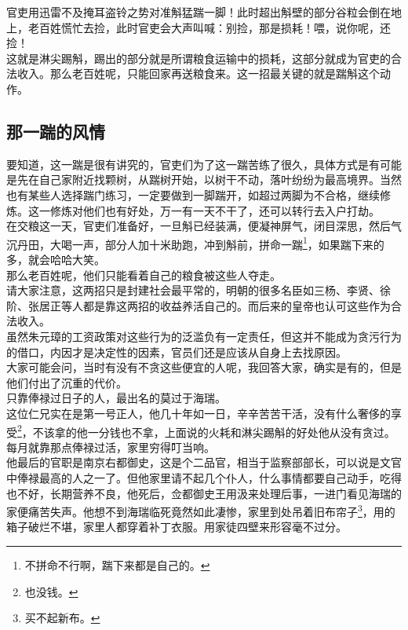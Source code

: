 \begin{multicols}{\theparacolNo}
官吏用迅雷不及掩耳盗铃之势对准斛猛踹一脚！此时超出斛壁的部分谷粒会倒在地上，老百姓慌忙去捡，此时官吏会大声叫喊：别捡，那是损耗！喂，说你呢，还捡！\\

这就是淋尖踢斛，踢出的部分就是所谓粮食运输中的损耗，这部分就成为官吏的合法收入。那么老百姓呢，只能回家再送粮食来。这一招最关键的就是踹斛这个动作。\\

\subsection{那一踹的风情}
要知道，这一踹是很有讲究的，官吏们为了这一踹苦练了很久，具体方式是有可能是先在自己家附近找颗树，从踹树开始，以树干不动，落叶纷纷为最高境界。当然也有某些人选择踹门练习，一定要做到一脚踹开，如超过两脚为不合格，继续修炼。这一修炼对他们也有好处，万一有一天不干了，还可以转行去入户打劫。\\

在交粮这一天，官吏们准备好，一旦斛已经装满，便凝神屏气，闭目深思，然后气沉丹田，大喝一声，部分人加十米助跑，冲到斛前，拼命一踹\footnote{不拼命不行啊，踹下来都是自己的。}，如果踹下来的多，就会哈哈大笑。\\

那么老百姓呢，他们只能看着自己的粮食被这些人夺走。\\

请大家注意，这两招只是封建社会最平常的，明朝的很多名臣如三杨、李贤、徐阶、张居正等人都是靠这两招的收益养活自己的。而后来的皇帝也认可这些作为合法收入。\\

虽然朱元璋的工资政策对这些行为的泛滥负有一定责任，但这并不能成为贪污行为的借口，内因才是决定性的因素，官员们还是应该从自身上去找原因。\\

大家可能会问，当时有没有不贪这些便宜的人呢，我回答大家，确实是有的，但是他们付出了沉重的代价。\\

只靠俸禄过日子的人，最出名的莫过于海瑞。\\

这位仁兄实在是第一号正人，他几十年如一日，辛辛苦苦干活，没有什么奢侈的享受\footnote{也没钱。}，不该拿的他一分钱也不拿，上面说的火耗和淋尖踢斛的好处他从没有贪过。每月就靠那点俸禄过活，家里穷得叮当响。\\

他最后的官职是南京右都御史，这是个二品官，相当于监察部部长，可以说是文官中俸禄最高的人之一了。但他家里请不起几个仆人，什么事情都要自己动手，吃得也不好，长期营养不良，他死后，佥都御史王用汲来处理后事，一进门看见海瑞的家便痛苦失声。他想不到海瑞临死竟然如此凄惨，家里到处吊着旧布帘子\footnote{买不起新布。}，用的箱子破烂不堪，家里人都穿着补丁衣服。用家徒四壁来形容毫不过分。\\


\end{multicols}
